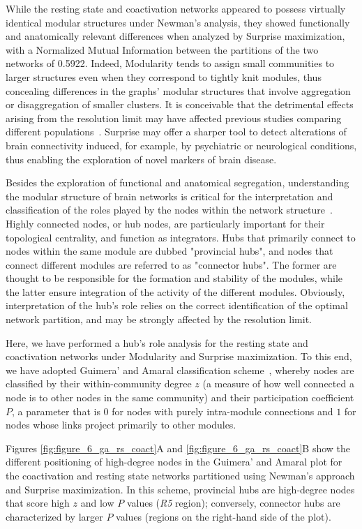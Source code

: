 While the resting state and coactivation networks appeared to possess virtually identical modular structures under Newman's analysis, they showed functionally and anatomically relevant differences when analyzed by Surprise maximization, with a Normalized Mutual Information between the partitions of the two networks of 0.5922. Indeed, Modularity tends to assign small communities to larger structures even when they correspond to tightly knit modules, thus concealing differences in the graphs' modular structures that involve aggregation or disaggregation of smaller clusters. It is conceivable that the detrimental effects arising from the resolution limit may have affected previous studies comparing different populations~\cite{meunier2010}.
Surprise may offer a sharper tool to detect alterations of brain connectivity induced, for example, by psychiatric or neurological conditions, thus enabling the exploration of novel markers of brain disease.

Besides the exploration of functional and anatomical segregation, understanding the modular structure of brain networks is critical for the interpretation and classification of the roles played by the nodes within the network structure~\cite{sporns2007}. Highly connected nodes, or hub nodes, are particularly important for their topological centrality, and function as integrators. Hubs that primarily connect to nodes within the same module are dubbed "provincial hubs", and nodes that connect different modules are referred to as "connector hubs". The former are thought to be responsible for the formation and stability of the modules, while the latter ensure integration of the activity of the different modules. Obviously, interpretation of the hub's role relies on the correct identification of the optimal network partition, and may be strongly affected by the resolution limit.

Here, we have performed a hub's role analysis for the resting state and coactivation networks under Modularity and Surprise maximization.
To this end, we have adopted Guimera' and Amaral classification scheme~\cite{guimera2005}, whereby nodes are classified by their within-community degree $z$ (a measure of how well connected a node is to other nodes in the same community) and their participation coefficient $P$, a parameter that is $0$ for nodes with purely intra-module connections and $1$ for nodes whose links project primarily to other modules. 

Figures \ref{fig:figure_6_ga_rs_coact}A and \ref{fig:figure_6_ga_rs_coact}B show the different positioning of high-degree nodes in the Guimera' and Amaral plot for the coactivation and resting state networks partitioned using Newman’s approach and Surprise maximization. In this scheme, provincial hubs are high-degree nodes that score high $z$ and low $P$ values (\emph{R5} region); conversely, connector hubs are characterized by larger $P$ values (regions on the right-hand side of the plot).

